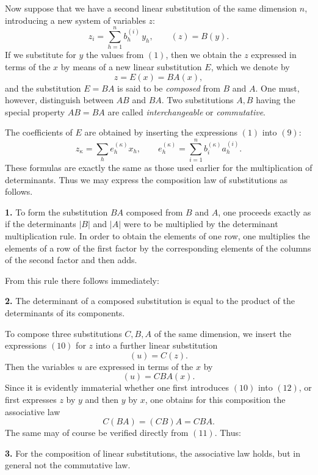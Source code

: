 \documentclass[11pt,a4paper]{book}
\begin{document}
Now suppose that we have a second linear substitution of the same dimension \(n\), introducing a new system of variables \(z\):
\[
z_i=\sum_{h=1}^n b^{(i)}_h\,y_h,\qquad (z)=B(y).
\tag{9}
\]
If we substitute for \(y\) the values from \((1)\), then we obtain the \(z\) expressed in terms of the \(x\) by means of a new linear substitution \(E\), which we denote by
\[
z=E(x)=BA(x),
\tag{10}
\]
and the substitution \(E=BA\) is said to be \emph{composed} from \(B\) and \(A\). One must, however, distinguish between \(AB\) and \(BA\). Two substitutions \(A,B\) having the special property \(AB=BA\) are called \emph{interchangeable} or \emph{commutative}.

The coefficients of \(E\) are obtained by inserting the expressions \((1)\) into \((9)\):
\[
z_\kappa=\sum_h e^{(\kappa)}_h x_h,\qquad
e^{(\kappa)}_h=\sum_{i=1}^n b^{(\kappa)}_i a^{(i)}_h.
\tag{11}
\]
These formulas are exactly the same as those used earlier for the multiplication of determinants. Thus we may express the composition law of substitutions as follows.

\medskip
\noindent\textbf{1.}
To form the substitution \(BA\) composed from \(B\) and \(A\), one proceeds exactly as if the determinants \(|B|\) and \(|A|\) were to be multiplied by the determinant multiplication rule. In order to obtain the elements of one row, one multiplies the elements of a row of the first factor by the corresponding elements of the columns of the second factor and then adds.

\medskip
From this rule there follows immediately:

\medskip
\noindent\textbf{2.}
The determinant of a composed substitution is equal to the product of the determinants of its components.

\medskip
To compose three substitutions \(C,B,A\) of the same dimension, we insert the expressions \((10)\) for \(z\) into a further linear substitution
\[
(u)=C(z).
\tag{12}
\]
Then the variables \(u\) are expressed in terms of the \(x\) by
\[
(u)=CBA(x).
\tag{13}
\]
Since it is evidently immaterial whether one first introduces \((10)\) into \((12)\), or first expresses \(z\) by \(y\) and then \(y\) by \(x\), one obtains for this composition the associative law
\[
C(BA)=(CB)A=CBA.
\tag{14}
\]
The same may of course be verified directly from \((11)\). Thus:

\medskip
\noindent\textbf{3.}
For the composition of linear substitutions, the associative law holds, but in general not the commutative law.
\end{document}
